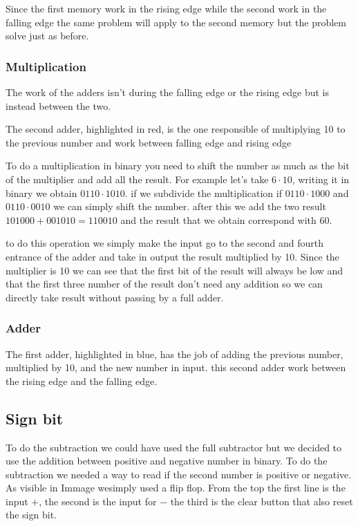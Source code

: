 \documentclass{article}
\begin{document}
Since the first memory work in the rising edge while the second work in the falling edge the same problem will apply to the second memory but the problem solve just as before.


\subsubsection{Multiplication}

The work of the adders isn't during the falling edge or the rising edge but is instead  between the two.

\vspace{3mm}

The second adder, highlighted in red, is the one responsible of multiplying 10 to the previous number and work between falling edge and rising edge

To do a multiplication in binary you need to shift the number as much as the bit of the multiplier and add all the result. For example let's take $6 \cdot 10$, writing it in binary we obtain 
$0110 \cdot 1010$. if we subdivide the multiplication if $0110 \cdot 1000$ and $0110 \cdot 0010$ we can simply shift the number. 
after this we add the two result $101000 + 001010 = 110010$ and the result that we obtain correspond with 60.

\vspace{3mm}

to do this operation we simply make the input go to the second and fourth entrance of the adder and take in output the result multiplied by 10. Since the multiplier is 10 we can see that the first bit of the result will always be low and that the first three number of the result don't need any addition so we can directly take result without passing by a full adder.


\subsubsection{Adder}

The first adder, highlighted in blue, has the job of adding the previous number, multiplied by 10, and the new number in input. this second adder work between the rising edge and the falling edge.



\subsection{Sign bit}

To do the subtraction we could have used the full subtractor but we decided to use the addition between positive and negative number in binary. To do the subtraction we needed a way to read if the second number is positive or negative. As visible in Immage %
wesimply used a flip flop. 
From the top the first line is the input $+$, the second is the input for $-$ the third is the clear button that also reset the sign bit.
\end{document}
